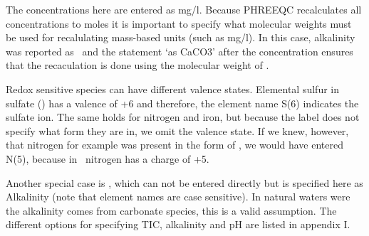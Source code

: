 The concentrations here are entered as mg/l. Because PHREEQC recalculates all concentrations to moles it is important to specify what molecular weights must be used for recalulating mass-based units (such as mg/l). In this case, alkalinity was reported as \cc\ and the statement `as CaCO3' after the concentration ensures that the recaculation is done using the molecular weight of \cc. 

Redox sensitive species can have different valence states. Elemental sulfur in sulfate (\su) has a valence of +6 and therefore, the element name S(6) indicates the sulfate ion. The same holds for nitrogen and iron, but because the label does not specify what form they are in, we omit the valence state. If we knew, however, that nitrogen for example was present in the form of \no, we would have entered N(5), because in \no\ nitrogen has a charge of +5.

Another special case is \bi, which can not be entered directly but is specified here as Alkalinity (note that element names are case sensitive). In natural waters were the alkalinity comes from carbonate species, this is a valid assumption. The different options for specifying TIC, alkalinity and pH are listed in appendix I.

